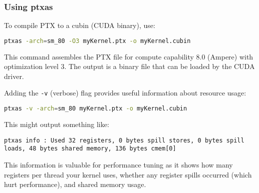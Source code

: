 \subsubsection{Using ptxas}

To compile PTX to a cubin (CUDA binary), use:

\begin{lstlisting}[language=bash]
ptxas -arch=sm_80 -O3 myKernel.ptx -o myKernel.cubin
\end{lstlisting}

This command assembles the PTX file for compute capability 8.0 (Ampere) with optimization level 3. The output is a binary file that can be loaded by the CUDA driver.

Adding the \texttt{-v} (verbose) flag provides useful information about resource usage:

\begin{lstlisting}[language=bash]
ptxas -v -arch=sm_80 myKernel.ptx -o myKernel.cubin
\end{lstlisting}

This might output something like:
\begin{lstlisting}
ptxas info : Used 32 registers, 0 bytes spill stores, 0 bytes spill loads, 48 bytes shared memory, 136 bytes cmem[0]
\end{lstlisting}

This information is valuable for performance tuning as it shows how many registers per thread your kernel uses, whether any register spills occurred (which hurt performance), and shared memory usage.


